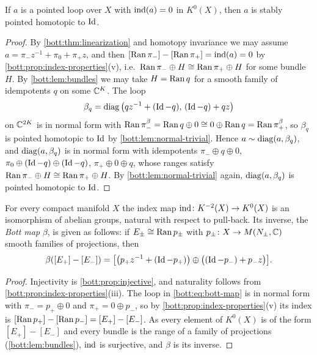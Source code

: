 \begin{proposition}\label{bott:prop:injective}
  If $a$ is a pointed loop over $X$ with $\operatorname{ind}(a)=0$ in $K^0(X)$, then $a$ is stably
  pointed homotopic to $\operatorname{Id}$.
\end{proposition}
\begin{proof}
  By \cref{bott:thm:linearization} and homotopy invariance we may assume
  $a=\pi_-z^{-1}+\pi_0+\pi_+z$, and then $[\operatorname{Ran}\pi_-]-[\operatorname{Ran}\pi_+]=\operatorname{ind}(a)=0$ by
  \cref{bott:prop:index-properties}(v), i.e.\ $\operatorname{Ran}\pi_-\oplus H\cong\operatorname{Ran}\pi_+\oplus H$ for
  some bundle $H$. By \cref{bott:lem:bundles} we may take $H=\operatorname{Ran} q$ for a smooth family of
  idempotents $q$ on some $\mathbb{C}^K$. The loop
  \begin{equation*}
    \beta_q=\operatorname{diag}\big(qz^{-1}+(\operatorname{Id}-q),\,(\operatorname{Id}-q)+qz\big)
  \end{equation*}
  on $\mathbb{C}^{2K}$ is in normal form with $\operatorname{Ran}\pi_-^{\beta}=\operatorname{Ran} q\oplus0\cong0\oplus\operatorname{Ran} q=\operatorname{Ran}\pi_+^\beta$,
  so $\beta_q$ is pointed homotopic to $\operatorname{Id}$ by \cref{bott:lem:normal-trivial}. Hence
  $a\sim\operatorname{diag}(a,\beta_q)$, and $\operatorname{diag}(a,\beta_q)$ is in normal form with idempotents
  $\pi_-\oplus q\oplus0$, $\pi_0\oplus(\operatorname{Id}-q)\oplus(\operatorname{Id}-q)$, $\pi_+\oplus0\oplus q$, whose
  ranges satisfy $\operatorname{Ran}\pi_-\oplus H\cong\operatorname{Ran}\pi_+\oplus H$. By
  \cref{bott:lem:normal-trivial} again, $\operatorname{diag}(a,\beta_q)$ is pointed homotopic to $\operatorname{Id}$.
\end{proof}

\begin{theorem}\label{bott:thm:index-iso}
  For every compact manifold $X$ the index map $\operatorname{ind}\colon K^{-2}(X)\to K^0(X)$ is an
  isomorphism of abelian groups, natural with respect to pull-back. Its inverse, the
  \emph{Bott map} $\beta$, is given as follows: if $E_\pm\cong\operatorname{Ran} p_\pm$ with
  $p_\pm\colon X\to M(N_\pm,\mathbb{C})$ smooth families of projections, then
  \begin{equation}\label{bott:eq:bott-map}
    \beta([E_+]-[E_-])=\big[\big(p_+z^{-1}+(\operatorname{Id}-p_+)\big)\oplus\big((\operatorname{Id}-p_-)+p_-z\big)\big].
  \end{equation}
\end{theorem}
\begin{proof}
  Injectivity is \cref{bott:prop:injective}, and naturality follows from
  \cref{bott:prop:index-properties}(iii). The loop in \eqref{bott:eq:bott-map} is in normal
  form with $\pi_-=p_+\oplus0$ and $\pi_+=0\oplus p_-$, so by
  \cref{bott:prop:index-properties}(v) its index is $[\operatorname{Ran} p_+]-[\operatorname{Ran} p_-]=[E_+]-[E_-]$. As
  every element of $K^0(X)$ is of the form $[E_+]-[E_-]$ and every bundle is the range
  of a family of projections (\cref{bott:lem:bundles}), $\operatorname{ind}$ is surjective, and
  $\beta$ is its inverse.
\end{proof}

